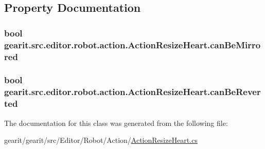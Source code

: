 \subsection{Property Documentation}
\hypertarget{classgearit_1_1src_1_1editor_1_1robot_1_1action_1_1_action_resize_heart_ab5a5a08dbe68597f3b36171d0759bbe1}{
\subsubsection[{can\+Be\+Mirrored}]{\setlength{\rightskip}{0pt plus 5cm}bool gearit.\+src.\+editor.\+robot.\+action.\+Action\+Resize\+Heart.\+can\+Be\+Mirrored\hspace{0.3cm}{\ttfamily [get]}}}\label{classgearit_1_1src_1_1editor_1_1robot_1_1action_1_1_action_resize_heart_ab5a5a08dbe68597f3b36171d0759bbe1}
\hypertarget{classgearit_1_1src_1_1editor_1_1robot_1_1action_1_1_action_resize_heart_a54efd57a9c57d31bab42f87b8e8ed1f3}{
\subsubsection[{can\+Be\+Reverted}]{\setlength{\rightskip}{0pt plus 5cm}bool gearit.\+src.\+editor.\+robot.\+action.\+Action\+Resize\+Heart.\+can\+Be\+Reverted\hspace{0.3cm}{\ttfamily [get]}}}\label{classgearit_1_1src_1_1editor_1_1robot_1_1action_1_1_action_resize_heart_a54efd57a9c57d31bab42f87b8e8ed1f3}


The documentation for this class was generated from the following file\+:\begin{DoxyCompactItemize}
\item 
gearit/gearit/src/\+Editor/\+Robot/\+Action/\hyperlink{_action_resize_heart_8cs}{Action\+Resize\+Heart.\+cs}\end{DoxyCompactItemize}
